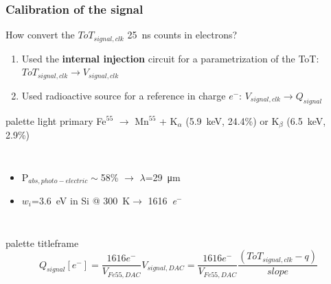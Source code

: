    \begin{frame}
        \frametitle{Calibration of the signal}
        How convert the $ToT_{signal, clk}$ \SI{25}{ns} counts in electrons?
        \smallskip
        \pause
        \begin{enumerate}
            \item Used the \textbf{internal injection} circuit for a parametrization of the ToT: $ToT_{signal,clk}\rightarrow V_{signal, clk}$
            \item Used radioactive source for a reference in charge $e^-$: $V_{signal, clk}\rightarrow Q_{signal}$
        \end{enumerate}
        \medskip
        \pause
        \begin{beamercolorbox}[sep=0em,wd=0.95\textwidth,ht=1.5ex, dp=0.1ex, rounded=true, center]{palette light primary}
            Fe$^{55}$ $\rightarrow$ Mn$^{55}$ + K$_\alpha$ (\SI{5.9}{keV}, 24.4\%) or K$_\beta$ (\SI{6.5}{keV}, 2.9\%)
        \end{beamercolorbox}
        \begin{columns}
            \begin{itemize}
                \item P$_{abs, photo-electric}\sim$58\% $\rightarrow$ $\lambda$=\SI{29}{\um}
                \item $w_i$=\SI{3.6}{eV} in Si @ \SI{300}{\kelvin}$\rightarrow$ \SI{1616}{\elementarycharge}$^-$
            \end{itemize}
        \end{columns}
        \medskip
        \pause
        \begin{beamercolorbox}[rounded=true, center]{palette titleframe}
        \begin{equation*}
            Q_{signal}[e^-] = \frac{1616e^-}{V_{Fe55,DAC}}V_{signal,DAC}=\frac{1616e^-}{V_{Fe55,DAC}}\frac{(ToT_{signal,clk}-q)}{slope}
        \end{equation*}
    \end{beamercolorbox}
    \end{frame}  




